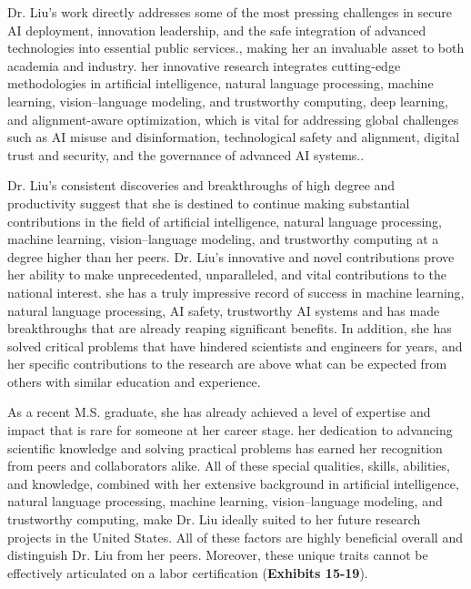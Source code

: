 \documentclass{article}
\begin{document}
Dr. Liu's work directly addresses some of the most pressing challenges in secure AI deployment, innovation leadership, and the safe integration of advanced technologies into essential public services., making her an invaluable asset to both academia and industry. her innovative research integrates cutting-edge methodologies in artificial intelligence, natural language processing, machine learning, vision–language modeling, and trustworthy computing, deep learning, and alignment-aware optimization, which is vital for addressing global challenges such as AI misuse and disinformation, technological safety and alignment, digital trust and security, and the governance of advanced AI systems..

Dr. Liu's consistent discoveries and breakthroughs of high degree and productivity suggest that she is destined to continue making substantial contributions in the field of artificial intelligence, natural language processing, machine learning, vision–language modeling, and trustworthy computing at a degree higher than her peers. Dr. Liu's innovative and novel contributions prove her ability to make unprecedented, unparalleled, and vital contributions to the national interest. she has a truly impressive record of success in machine learning, natural language processing, AI safety,  trustworthy AI systems and has made breakthroughs that are already reaping significant benefits. In addition, she has solved critical problems that have hindered scientists and engineers for years, and her specific contributions to the research are above what can be expected from others with similar education and experience.

As a recent M.S. graduate, she has already achieved a level of expertise and impact that is rare for someone at her career stage. her dedication to advancing scientific knowledge and solving practical problems has earned her recognition from peers and collaborators alike. All of these special qualities, skills, abilities, and knowledge, combined with her extensive background in artificial intelligence, natural language processing, machine learning, vision–language modeling, and trustworthy computing, make Dr. Liu ideally suited to her future research projects in the United States. All of these factors are highly beneficial overall and distinguish Dr. Liu from her peers. Moreover, these unique traits cannot be effectively articulated on a labor certification (\textbf{Exhibits 15-19}).
\end{document}

